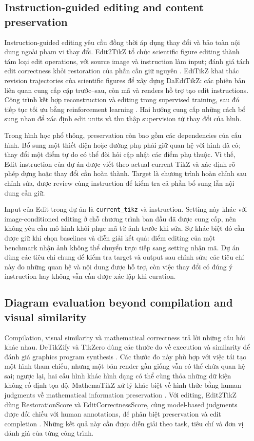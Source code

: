 \documentclass[a4paper,12pt]{article}
\begin{document}
\subsection{Instruction-guided editing and content preservation}
Instruction-guided editing yêu cầu đồng thời áp dụng thay đổi và bảo toàn nội dung ngoài phạm vi thay đổi. Edit2TikZ tổ chức scientific figure editing thành tám loại edit operations, với source image và instruction làm input; đánh giá tách edit correctness khỏi restoration của phần cần giữ nguyên \cite{edit2tikz}. EdiTikZ khai thác revision trajectories của scientific figures để xây dựng DaEdiTikZ: các phiên bản liên quan cung cấp cặp trước--sau, còn mã và renders hỗ trợ tạo edit instructions. Công trình kết hợp reconstruction và editing trong supervised training, sau đó tiếp tục tối ưu bằng reinforcement learning \cite{editikz}. Hai hướng cung cấp những cách bổ sung nhau để xác định edit units và thu thập supervision từ thay đổi của hình.

Trong hình học phổ thông, preservation còn bao gồm các dependencies của cấu hình. Bổ sung một thiết diện hoặc đường phụ phải giữ quan hệ với hình đã có; thay đổi một điểm tự do có thể đòi hỏi cập nhật các điểm phụ thuộc. Vì thế, Edit instruction của dự án được viết theo actual current TikZ và xác định rõ phép dựng hoặc thay đổi cần hoàn thành. Target là chương trình hoàn chỉnh sau chỉnh sửa, được review cùng instruction để kiểm tra cả phần bổ sung lẫn nội dung cần giữ.

Input của Edit trong dự án là \texttt{current\_tikz} và instruction. Setting này khác với image-conditioned editing ở chỗ chương trình ban đầu đã được cung cấp, nên không yêu cầu mô hình khôi phục mã từ ảnh trước khi sửa. Sự khác biệt đó cần được giữ khi chọn baselines và diễn giải kết quả: điểm editing của một benchmark nhận ảnh không thể chuyển trực tiếp sang setting nhận mã. Dự án dùng các tiêu chí chung để kiểm tra target và output sau chỉnh sửa; các tiêu chí này đo những quan hệ và nội dung được hỗ trợ, còn việc thay đổi có đúng ý instruction hay không vẫn cần được xác lập khi curation.

\subsection{Diagram evaluation beyond compilation and visual similarity}
Compilation, visual similarity và mathematical correctness trả lời những câu hỏi khác nhau. DeTikZify và TikZero dùng các thước đo về execution và similarity để đánh giá graphics program synthesis \cite{detikzify,ref1}. Các thước đo này phù hợp với việc tái tạo một hình tham chiếu, nhưng một bản render gần giống vẫn có thể chứa quan hệ sai; ngược lại, hai cấu hình khác hình dạng có thể cùng thỏa những dữ kiện không cố định tọa độ. MathemaTikZ xử lý khác biệt về hình thức bằng human judgments về mathematical information preservation \cite{mathematikz}. Với editing, Edit2TikZ dùng RestorationScore và EditCorrectnessScore, cùng model-based judgments được đối chiếu với human annotations, để phân biệt preservation và edit completion \cite{edit2tikz}. Những kết quả này cần được diễn giải theo task, tiêu chí và đơn vị đánh giá của từng công trình.
\end{document}
